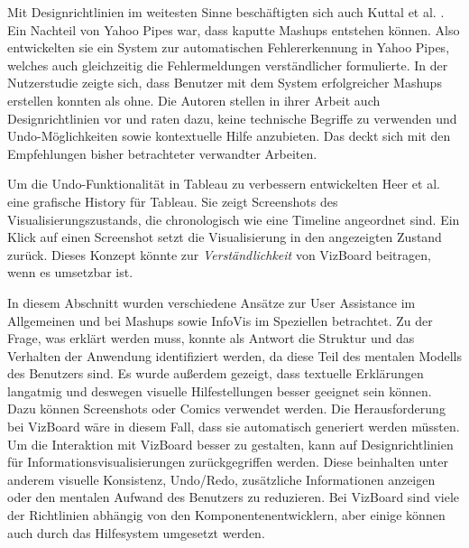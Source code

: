 \documentclass[
	headsepline,
	footsepline,
	fontsize=12pt,
	bibliography=totoc
]{scrbook}
\begin{document}

Mit Designrichtlinien im weitesten Sinne beschäftigten sich auch Kuttal et al. \cite{Kuttal2013}. Ein Nachteil von Yahoo Pipes war, dass kaputte Mashups entstehen können. Also entwickelten sie ein System zur automatischen Fehlererkennung in Yahoo Pipes, welches auch gleichzeitig die Fehlermeldungen verständlicher formulierte. In der Nutzerstudie zeigte sich, dass Benutzer mit dem System erfolgreicher Mashups erstellen konnten als ohne. Die Autoren stellen in ihrer Arbeit auch Designrichtlinien vor und raten dazu, keine technische Begriffe zu verwenden und Undo-Möglichkeiten sowie kontextuelle Hilfe anzubieten. Das deckt sich mit den Empfehlungen bisher betrachteter verwandter Arbeiten.


Um die Undo-Funktionalität in Tableau zu verbessern entwickelten Heer et al. \cite{Heer2008} eine grafische History für Tableau. Sie zeigt Screenshots des Visualisierungszustands, die chronologisch wie eine Timeline angeordnet sind. Ein Klick auf einen Screenshot setzt die Visualisierung in den angezeigten Zustand zurück. Dieses Konzept könnte zur \emph{Verständlichkeit} von VizBoard beitragen, wenn es umsetzbar ist.



In diesem Abschnitt wurden verschiedene Ansätze zur User Assistance im Allgemeinen und bei Mashups sowie InfoVis im Speziellen betrachtet. Zu der Frage, was erklärt werden muss, konnte als Antwort die Struktur und das Verhalten der Anwendung identifiziert werden, da diese Teil des mentalen Modells des Benutzers sind. Es wurde außerdem gezeigt, dass textuelle Erklärungen langatmig und deswegen visuelle Hilfestellungen besser geeignet sein können. Dazu können Screenshots oder Comics verwendet werden. Die Herausforderung bei VizBoard wäre in diesem Fall, dass sie automatisch generiert werden müssten. Um die Interaktion mit VizBoard besser zu gestalten, kann auf Designrichtlinien für Informationsvisualisierungen zurückgegriffen werden. Diese beinhalten unter anderem visuelle Konsistenz, Undo/Redo, zusätzliche Informationen anzeigen oder den mentalen Aufwand des Benutzers zu reduzieren. Bei VizBoard sind viele der Richtlinien abhängig von den Komponentenentwicklern, aber einige können auch durch das Hilfesystem umgesetzt werden.
\end{document}
